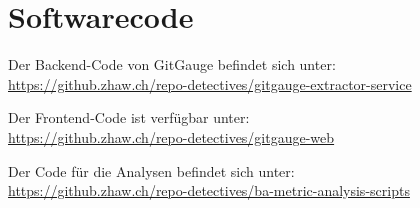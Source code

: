 


\chapter{Softwarecode} %

\label{ApendixD} %

Der Backend-Code von GitGauge befindet sich unter:\\ \href{https://github.zhaw.ch/repo-detectives/gitgauge-extractor-service}{https://github.zhaw.ch/repo-detectives/gitgauge-extractor-service}

Der Frontend-Code ist verfügbar unter: \\ \href{https://github.zhaw.ch/repo-detectives/gitgauge-web}{https://github.zhaw.ch/repo-detectives/gitgauge-web} 

Der Code für die Analysen befindet sich unter: \\ \href{https://github.zhaw.ch/repo-detectives/ba-metric-analysis-scripts}{https://github.zhaw.ch/repo-detectives/ba-metric-analysis-scripts}
